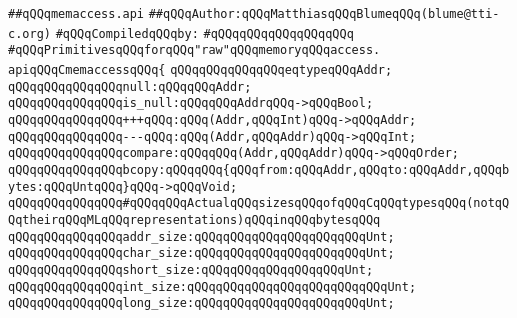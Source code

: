 \label{src/lib/c-glue-lib/ram/memaccess.api}
\verb|##qQQqmemaccess.api|\newline
\verb|##qQQqAuthor:qQQqMatthiasqQQqBlumeqQQq(blume@tti-c.org)|\newline
\newline
\verb|#qQQqCompiledqQQqby:|\newline
\verb|#qQQqqQQqqQQqqQQqqQQq|\newline
\newline
\newline
\newline
\verb|#qQQqPrimitivesqQQqforqQQq"raw"qQQqmemoryqQQqaccess.|\newline
\newline
\verb|apiqQQqCmemaccessqQQq{|\newline
\newline
\verb|qQQqqQQqqQQqqQQqeqtypeqQQqAddr;|\newline
\newline
\verb|qQQqqQQqqQQqqQQqnull:qQQqqQQqAddr;|\newline
\verb|qQQqqQQqqQQqqQQqis_null:qQQqqQQqAddrqQQq->qQQqBool;|\newline
\newline
\verb|qQQqqQQqqQQqqQQq+++qQQq:qQQq(Addr,qQQqInt)qQQq->qQQqAddr;|\newline
\verb|qQQqqQQqqQQqqQQq---qQQq:qQQq(Addr,qQQqAddr)qQQq->qQQqInt;|\newline
\newline
\verb|qQQqqQQqqQQqqQQqcompare:qQQqqQQq(Addr,qQQqAddr)qQQq->qQQqOrder;|\newline
\verb|qQQqqQQqqQQqqQQqbcopy:qQQqqQQq{qQQqfrom:qQQqAddr,qQQqto:qQQqAddr,qQQqbytes:qQQqUntqQQq}qQQq->qQQqVoid;|\newline
\newline
\verb|qQQqqQQqqQQqqQQq#qQQqqQQqActualqQQqsizesqQQqofqQQqCqQQqtypesqQQq(notqQQqtheirqQQqMLqQQqrepresentations)qQQqinqQQqbytesqQQq|\newline
\verb|qQQqqQQqqQQqqQQqaddr_size:qQQqqQQqqQQqqQQqqQQqqQQqUnt;|\newline
\verb|qQQqqQQqqQQqqQQqchar_size:qQQqqQQqqQQqqQQqqQQqqQQqUnt;|\newline
\verb|qQQqqQQqqQQqqQQqshort_size:qQQqqQQqqQQqqQQqqQQqUnt;|\newline
\verb|qQQqqQQqqQQqqQQqint_size:qQQqqQQqqQQqqQQqqQQqqQQqqQQqUnt;|\newline
\verb|qQQqqQQqqQQqqQQqlong_size:qQQqqQQqqQQqqQQqqQQqqQQqUnt;|\newline
